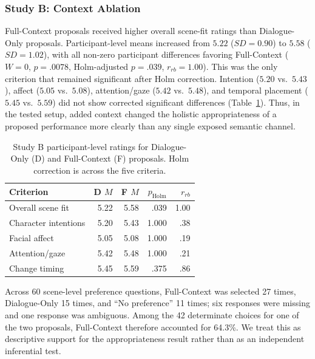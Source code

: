 \subsubsection{Study B: Context Ablation}
Full-Context proposals received higher overall scene-fit ratings than
Dialogue-Only proposals. Participant-level means increased from
$5.22$ ($SD=0.90$) to $5.58$ ($SD=1.02$), with all non-zero participant
differences favoring Full-Context ($W=0$, $p=.0078$, Holm-adjusted $p=.039$,
$r_{rb}=1.00$). This was the only criterion that remained significant after
Holm correction. Intention ($5.20$ vs.\ $5.43$), affect ($5.05$ vs.\ $5.08$),
attention/gaze ($5.42$ vs.\ $5.48$), and temporal placement ($5.45$ vs.\
$5.59$) did not show corrected significant differences
(Table~\ref{tab:context_results}). Thus, in the tested setup, added context
changed the holistic appropriateness of a proposed performance more clearly
than any single exposed semantic channel.

\begin{table}[t]
\centering
\caption{Study B participant-level ratings for Dialogue-Only (D) and
Full-Context (F) proposals. Holm correction is across the five criteria.}
\label{tab:context_results}
\small
\begin{tabular}{lrrrr}
\toprule
Criterion & D $M$ & F $M$ & $p_{\mathrm{Holm}}$ & $r_{rb}$\\
\midrule
Overall scene fit & 5.22 & 5.58 & .039 & 1.00\\
Character intentions & 5.20 & 5.43 & 1.000 & .38\\
Facial affect & 5.05 & 5.08 & 1.000 & .19\\
Attention/gaze & 5.42 & 5.48 & 1.000 & .21\\
Change timing & 5.45 & 5.59 & .375 & .86\\
\bottomrule
\end{tabular}
\end{table}

Across 60 scene-level preference questions, Full-Context was selected 27 times,
Dialogue-Only 15 times, and ``No preference'' 11 times; six responses were
missing and one response was ambiguous. Among the 42 determinate choices for
one of the two proposals, Full-Context therefore accounted for 64.3\%.
We treat this as descriptive support for the appropriateness result rather than
as an independent inferential test.

